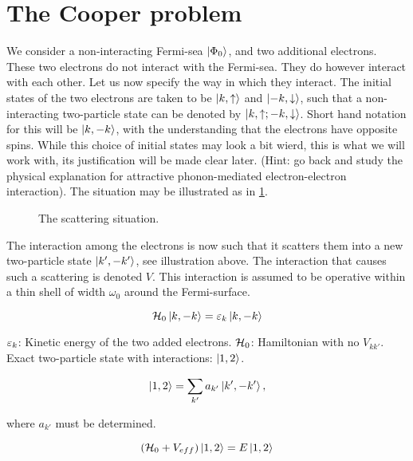 \section{The Cooper problem}

We consider a non-interacting Fermi-sea $\ket{\Phi_0}$, and two additional electrons. These two electrons do not interact with the Fermi-sea. They do however interact with each other. Let us now specify the way in which they interact. The initial states of the two electrons are taken to be $\ket{k,\uparrow}$ and $\ket{-k, \downarrow}$, such that a non-interacting two-particle state can be denoted by $\ket{k, \uparrow; -k, \downarrow}$. Short hand notation for this will be $\ket{k, -k}$, with the understanding that the electrons have opposite spins. While this choice of initial states may look a bit wierd, this is what we will work with, its justification will be made clear later. (Hint: go back and study the physical explanation for attractive phonon-mediated electron-electron interaction). The situation may be illustrated as in \cref{fig:cooper_situation}.

\begin{figure}
	\centering
	
	\caption{The scattering situation. }
	\label{fig:cooper_situation}
\end{figure}

The interaction among the electrons is now such that it scatters them into a new two-particle state $\ket{k', -k'}$, see illustration above. The interaction that causes such a scattering is denoted $V$. This interaction is assumed to be operative within a thin shell of width $\omega_0$ around the Fermi-surface. 

\begin{equation}
\mathcal{H}_0 \ket{k,-k} = \varepsilon_k \ket{k,-k}
\end{equation}

$\varepsilon_k$: Kinetic energy of the two added electrons. $\mathcal{H}_0$: Hamiltonian with no $V_{kk'}$. \\

Exact two-particle state with interactions: $\ket{1,2}$. 

\begin{equation}
\ket{1,2} = \sum_{k'} a_{k'}\ket{k', -k'},
\end{equation}

where $a_{k'}$ must be determined. 

\begin{equation}
(\mathcal{H}_0 + V_{eff})\ket{1,2} = E\ket{1,2}
\end{equation}

